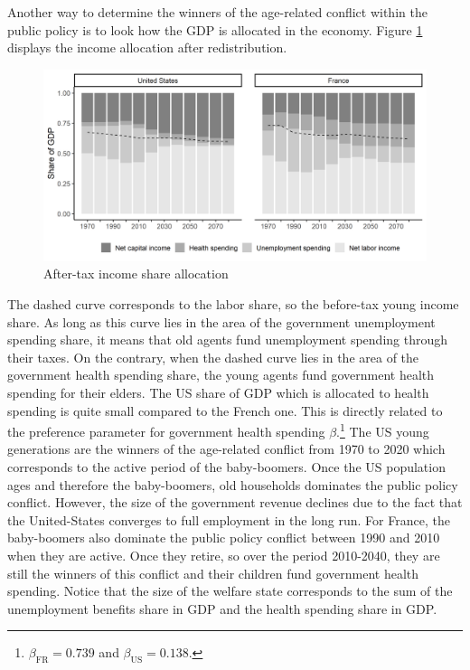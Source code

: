 Another way to determine the winners of the age-related conflict within the public policy is to look how the GDP is allocated in the economy. Figure \ref{fig:redis_step3_stacked} displays the income allocation after redistribution.
\begin{figure}[tb]
	\centering
	\caption{After-tax income share allocation} \label{fig:redis_step3_stacked}
	\includegraphics[width=1\linewidth]{../result/redistribution/redis_step3_stacked.png}
\end{figure}
The dashed curve corresponds to the labor share, so the before-tax young income share. As long as this curve lies in the area of the government unemployment spending share, it means that old agents fund unemployment spending through their taxes. On the contrary, when the dashed curve lies in the area of the government health spending share, the young agents fund government health spending for their elders. The US share of GDP which is allocated to health spending is quite small compared to the French one. This is directly related to the preference parameter for government health spending $\beta$.\footnote{$\beta_{\text{FR}} = 0.739$ and $\beta_{\text{US}} = 0.138$.} The US young generations are the winners of the age-related conflict from 1970 to 2020 which corresponds to the active period of the baby-boomers. Once the US population ages and therefore the baby-boomers, old households dominates the public policy conflict. However, the size of the government revenue declines due to the fact that the United-States converges to full employment in the long run. For France, the baby-boomers also dominate the public policy conflict between 1990 and 2010 when they are active. Once they retire, so over the period 2010-2040, they are still the winners of this conflict and their children fund government health spending. Notice that the size of the welfare state corresponds to the sum of the unemployment benefits share in GDP and the health spending share in GDP.

